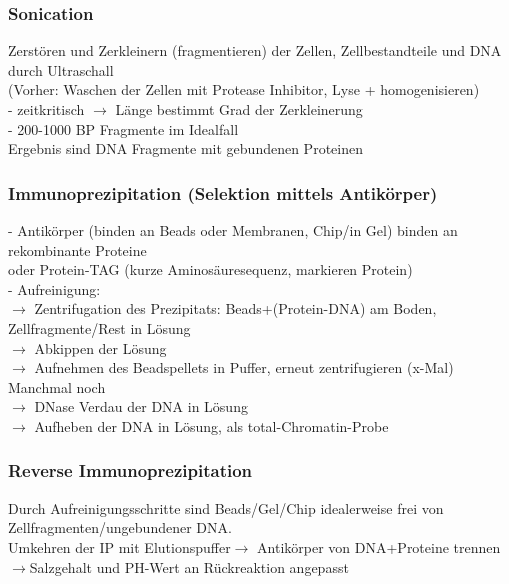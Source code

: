 \subsubsection{Sonication}
Zerstören und Zerkleinern (fragmentieren) der Zellen, Zellbestandteile und DNA durch Ultraschall\\
(Vorher: Waschen der Zellen mit Protease Inhibitor, Lyse + homogenisieren)\\
\hspace*{10mm}- zeitkritisch $\rightarrow$ Länge bestimmt Grad der Zerkleinerung\\
\hspace*{10mm}- 200-1000 BP Fragmente im Idealfall\\
Ergebnis sind DNA Fragmente mit gebundenen Proteinen\\

\subsubsection{Immunoprezipitation (Selektion mittels Antikörper)}
\hspace*{10mm}- Antikörper (binden an Beads oder Membranen, Chip/in Gel) binden an rekombinante Proteine\\
\hspace*{13mm}oder Protein-TAG (kurze Aminosäuresequenz, markieren Protein)\\
\hspace*{10mm}-	Aufreinigung:\\
\hspace*{15mm}$\rightarrow$ Zentrifugation des Prezipitats: Beads+(Protein-DNA) am Boden,\\
\hspace*{21mm}Zellfragmente/Rest in Lösung\\
\hspace*{15mm}$\rightarrow$ Abkippen der Lösung\\
\hspace*{15mm}$\rightarrow$ Aufnehmen des Beadspellets in Puffer, erneut zentrifugieren (x-Mal)\\ 
\hspace*{15mm}Manchmal noch\\
\hspace*{15mm}$\rightarrow$ DNase Verdau der DNA in Lösung\\
\hspace*{15mm}$\rightarrow$ Aufheben der DNA in Lösung, als total-Chromatin-Probe

\subsubsection{Reverse Immunoprezipitation}
Durch Aufreinigungsschritte sind Beads/Gel/Chip idealerweise frei von Zellfragmenten/ungebundener DNA.\\Umkehren der IP mit Elutionspuffer$\rightarrow$ Antikörper von DNA+Proteine trennen\\
$\rightarrow$Salzgehalt und PH-Wert an Rückreaktion angepasst

